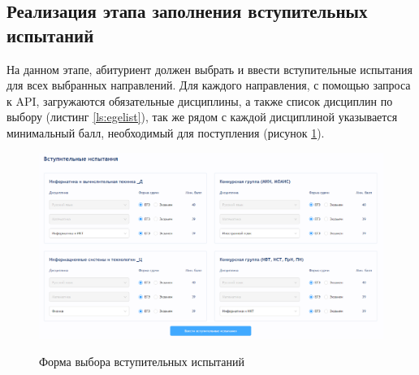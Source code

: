 \subsection{Реализация этапа заполнения вступительных испытаний}

На данном этапе, абитуриент должен выбрать и ввести вступительные испытания для всех выбранных направлений. Для каждого направления, с помощью запроса к API, загружаются обязательные дисциплины, а также список дисциплин по выбору (листинг \ref{ls:egelist}), так же рядом с каждой дисциплиной указывается минимальный балл, необходимый для поступления (рисунок \ref{fig:egescore}).

\begin{figure}[H]
\begin{center}
\includegraphics[width=0.9\hsize]{fig/input-ege-score.png}\\[2mm]
\caption{Форма выбора вступительных испытаний}\label{fig:egescore}
\end{center}
\end{figure}

